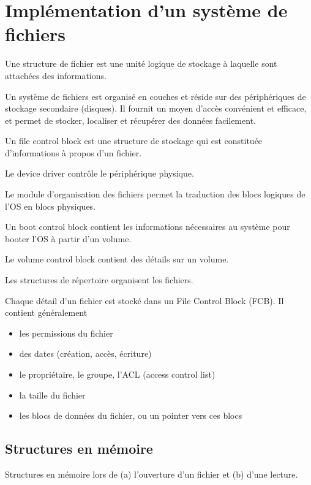 \chapter{Implémentation d'un système de fichiers}

Une structure de fichier est une unité logique de stockage à laquelle sont attachées des informations.

Un système de fichiers est organisé en couches et réside sur des périphériques de stockage secondaire (disques). Il fournit un moyen d'accès convénient et efficace, et permet de stocker, localiser et récupérer des données facilement.

Un file control block est une structure de stockage qui est constituée d'informations à propos d'un fichier.

Le device driver contrôle le périphérique physique.


Le module d'organisation des fichiers permet la traduction des blocs logiques de l'OS en blocs physiques.

Un boot control block contient les informations nécessaires au système pour booter l'OS à partir d'un volume.

Le volume control block contient des détails sur un volume.

Les structures de répertoire organisent les fichiers.

Chaque détail d'un fichier est stocké dans un File Control Block (FCB). Il contient généralement

\begin{itemize}
	\item les permissions du fichier
	\item des dates (création, accès, écriture)
	\item le propriétaire, le groupe, l'ACL (access control list)
	\item la taille du fichier
	\item les blocs de données du fichier, ou un pointer vers ces blocs
\end{itemize}

\section{Structures en mémoire}

Structures en mémoire lors de (a) l'ouverture d'un fichier et (b) d'une lecture.


